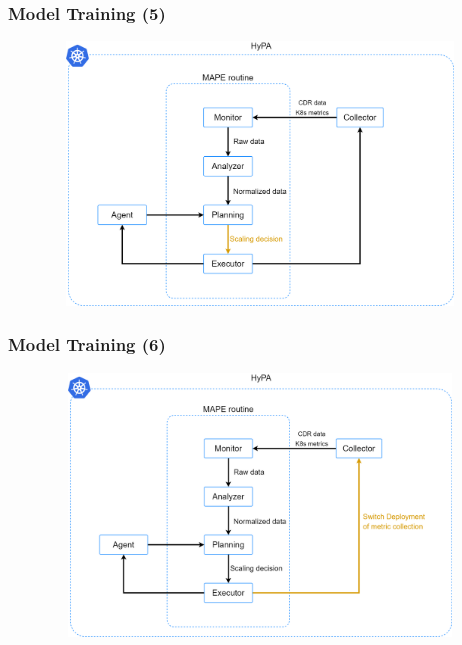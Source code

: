 \documentclass[11pt,t,usepdftitle=false,aspectratio=169]{beamer}
\begin{document}
\begin{frame}
	\frametitle{Model Training (5)}
	
	\begin{figure}
		\centering
		\vspace*{-0.4cm}
		\includegraphics[width=12cm,height=7cm]{_images/trainings_model_4.png}
	\end{figure}
\end{frame}

\begin{frame}
	\frametitle{Model Training (6)}
	
	\begin{figure}
		\centering
		\vspace*{-0.4cm}
		\includegraphics[width=12cm,height=7cm]{_images/trainings_model_5.png}
	\end{figure}
\end{frame}
\end{document}
